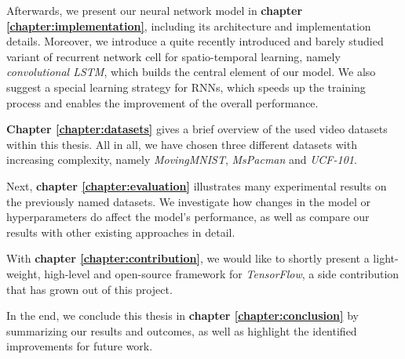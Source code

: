 Afterwards, we present our neural network model in \textbf{chapter \ref{chapter:implementation}}, including its architecture and implementation details. Moreover, we introduce a quite recently introduced and barely studied variant of recurrent network cell for spatio-temporal learning, namely \textit{convolutional LSTM}, which builds the central element of our model. We also suggest a special learning strategy for RNNs, which speeds up the training process and enables the improvement of the overall performance.

\textbf{Chapter \ref{chapter:datasets}} gives a brief overview of the used video datasets within this thesis. All in all, we have chosen three different datasets with increasing complexity, namely \textit{MovingMNIST}, \textit{MsPacman} and \textit{UCF-101}.

Next, \textbf{chapter \ref{chapter:evaluation}} illustrates many experimental results on the previously named datasets. We investigate how changes in the model or hyperparameters do affect the model's performance, as well as compare our results with other existing approaches in detail.

With \textbf{chapter \ref{chapter:contribution}}, we would like to shortly present a light-weight, high-level and open-source framework for \textit{TensorFlow}, a side contribution that has grown out of this project.

In the end, we conclude this thesis in \textbf{chapter \ref{chapter:conclusion}} by summarizing our results and outcomes, as well as highlight the identified improvements for future work.



